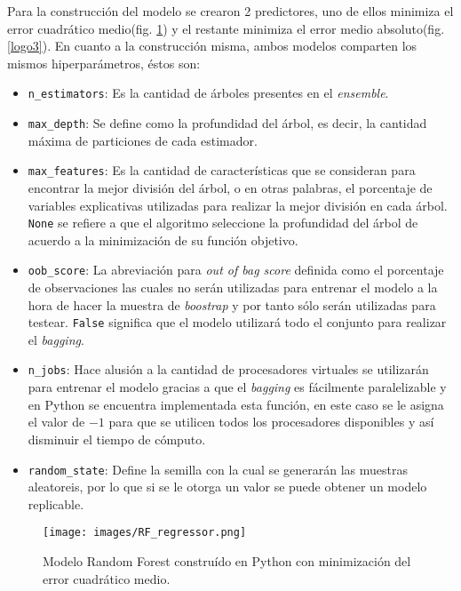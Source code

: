 Para la construcción del modelo se crearon 2 predictores, uno de ellos minimiza el error cuadrático medio(fig. \ref{logo2}) y el restante minimiza el error medio absoluto(fig. \ref{logo3}). En cuanto a la construcción misma, ambos modelos comparten los mismos hiperparámetros, 
éstos son:
\begin{itemize}
    \item \texttt{n\_estimators}: Es la cantidad de árboles presentes en el \textit{ensemble}. 
    \item \texttt{max\_depth}: Se define como la profundidad del árbol, es decir, la cantidad máxima de particiones de cada estimador.
    \item \texttt{max\_features}: Es la cantidad de características que se consideran para encontrar la mejor división del árbol, o en otras palabras, el porcentaje de variables explicativas utilizadas para realizar la mejor división en cada árbol. \texttt{None} 
    se refiere a que el algoritmo seleccione la profundidad del árbol de acuerdo a la minimización de su función objetivo.
    \item \texttt{oob\_score}: La abreviación para \textit{out of bag score} definida como el porcentaje de observaciones las cuales no serán utilizadas para entrenar el modelo a la hora de hacer la muestra de \textit{boostrap} y por tanto sólo serán utilizadas para testear.
    \texttt{False} significa que el modelo utilizará todo el conjunto para realizar el \textit{bagging}.
    \item \texttt{n\_jobs}: Hace alusión a la cantidad de procesadores virtuales se utilizarán para entrenar el modelo gracias a que el \textit{bagging} es fácilmente paralelizable y en Python se encuentra implementada esta función, en este caso se le asigna el valor de  
    $-1$ para que se utilicen todos los procesadores disponibles y así disminuir el tiempo de cómputo.
    \item \texttt{random\_state}: Define la semilla con la cual se generarán las muestras aleatoreis, por lo que si se le otorga un valor se puede obtener un modelo replicable.
\end{itemize}

\begin{figure}[h]
    \centering
          \texttt{[image: images/RF\_regressor.png]}
          \vskip -0.1in
    \caption[Construcción y entrenamiento del modelo Random Forest con criterio de \textit{mse}]{\footnotesize Modelo Random Forest construído en Python con minimización del error cuadrático medio.}
    \label{logo2}
\end{figure}

